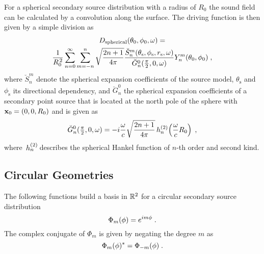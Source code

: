 For a spherical secondary source distribution with a radius of $R_0$
the sound field can be calculated by a convolution along the surface.
The driving function is then given by a simple division
as
%
\begin{multline}
    D_\text{spherical}(\theta_0,\phi_0,\omega) = \\ 
    \frac{1}{R_0^{\,2}}
    \sum_{n=0}^\infty \sum_{m=-n}^n \sqrt{\frac{2n+1}{4\pi}}
    \frac{\breve{S}_n^m(\theta_\text{s},\phi_\text{s},r_\text{s},\omega)}
    {\breve{G}_n^0(\frac{\pi}{2},0,\omega)} Y_n^m(\theta_0,\phi_0) \qc
    \label{eq:D_spherical}
\end{multline}
%
where $\breve{S}_n^m$ denote the spherical expansion
coefficients of the source model, $\theta_\text{s}$ and
$\phi_\text{s}$ its directional dependency, and $\breve{G}_n^0$
the spherical expansion coefficients of a
secondary point source that is located at the north pole of the sphere with $\mathbf{x}_0 =
(0,0,R_0)$ and is given as\autocite[][(25)]{Schultz2014}
%
\begin{equation}
    \breve{G}_n^0(\tfrac{\pi}{2},0,\omega) =
    -i\omegac \sqrt{\frac{2n+1}{4\pi}} \h{n}{2}\left(\omegac R_0\right) \qc
    \label{eq:G_spherical}
\end{equation}
where $\,h_{n}^{(2)}\!$ describes the spherical Hankel function of $n$-th order and
second kind.


\subsection{Circular Geometries}
\label{sec:circular_geometries}

The following functions build a basis in $\mathbb{R}^2$ for a circular secondary source
distribution\autocite{Williams1999}
%
\begin{equation}
    \Phi_m(\phi) = e^{im\phi} \qp
    \label{eq:circular_harmonics}
\end{equation}
%
The complex conjugate of $\Phi_m$ is given by negating the degree $m$ as
%
\begin{equation}
    \Phi_m(\phi)^* = \Phi_{-m}(\phi) \qp
    \label{eq:Phi_complex_conjugate}
\end{equation}
%

